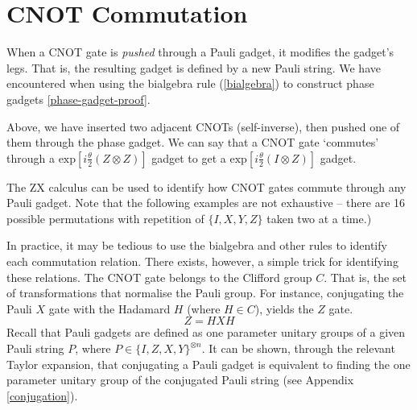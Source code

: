 \section{CNOT Commutation}

When a CNOT gate is \textit{pushed} through a Pauli gadget, it modifies the gadget's legs. That is, the resulting gadget is defined by a new Pauli string. We have encountered when using the bialgebra rule (\ref{bialgebra}) to construct phase gadgets \ref{phase-gadget-proof}.


Above, we have inserted two adjacent CNOTs (self-inverse), then pushed one of them through the phase gadget. We can say that a CNOT gate `commutes' through a $\text{exp} [i\frac{\theta}{2} (Z \otimes Z)]$ gadget to get a $\text{exp} [i\frac{\theta}{2} (I \otimes Z)]$ gadget.


The ZX calculus can be used to identify how CNOT gates commute through any Pauli gadget. Note that the following examples are not exhaustive -- there are 16 possible permutations with repetition of $\{I, X, Y, Z\}$ taken two at a time.)


In practice, it may be tedious to use the bialgebra and other rules to identify each commutation relation. There exists, however, a simple trick for identifying these relations. The CNOT gate belongs to the Clifford group $C$. That is, the set of transformations that normalise the Pauli group. For instance, conjugating the Pauli $X$ gate with the Hadamard $H$ (where $H \in C$), yields the $Z$ gate.
\begin{equation*}
    Z = HXH
\end{equation*}
Recall that Pauli gadgets are defined as one parameter unitary groups of a given Pauli string $P$, where $P \in \{I, Z, X, Y\}^{\otimes n}$. It can be shown, through the relevant Taylor expansion, that conjugating a Pauli gadget is equivalent to finding the one parameter unitary group of the conjugated Pauli string (see Appendix \ref{conjugation}).
